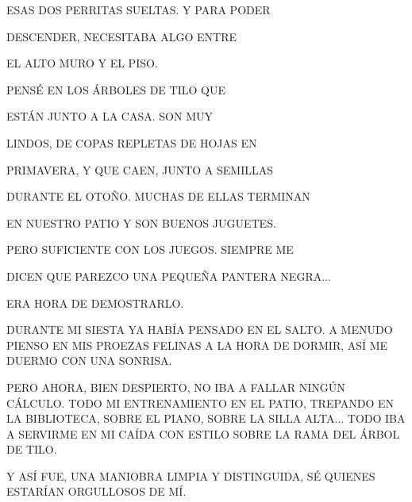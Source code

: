ESAS DOS PERRITAS 	SUELTAS. Y PARA PODER 

DESCENDER, 		NECESITABA ALGO ENTRE 

EL		
ALTO MURO Y EL PISO. 

PENSÉ EN LOS ÁRBOLES DE TILO QUE 

ESTÁN 		JUNTO A LA CASA. 		SON MUY 

LINDOS, DE COPAS REPLETAS DE HOJAS EN 

PRIMAVERA, Y  QUE CAEN, JUNTO A SEMILLAS 

DURANTE EL OTOÑO. MUCHAS DE ELLAS TERMINAN

EN NUESTRO PATIO Y SON BUENOS JUGUETES.

PERO SUFICIENTE CON LOS JUEGOS. 
SIEMPRE ME

DICEN QUE PAREZCO UNA PEQUEÑA PANTERA 
NEGRA$\ldots$ 

ERA HORA DE DEMOSTRARLO. 






\newpage
{}	
DURANTE MI SIESTA YA HABÍA PENSADO EN EL SALTO. A MENUDO PIENSO EN MIS PROEZAS FELINAS A LA HORA DE DORMIR, ASÍ ME DUERMO CON UNA SONRISA.

PERO AHORA, BIEN DESPIERTO, NO IBA A FALLAR NINGÚN CÁLCULO. TODO MI ENTRENAMIENTO EN EL PATIO, TREPANDO EN LA BIBLIOTECA, SOBRE EL PIANO, SOBRE LA SILLA ALTA$\ldots$ TODO IBA A SERVIRME EN MI CAÍDA CON ESTILO SOBRE LA RAMA DEL ÁRBOL DE TILO.  



\newpage
{}

\vspace{.7\textheight}
Y ASÍ FUE, UNA MANIOBRA LIMPIA Y DISTINGUIDA, SÉ QUIENES ESTARÍAN ORGULLOSOS DE MÍ. 





